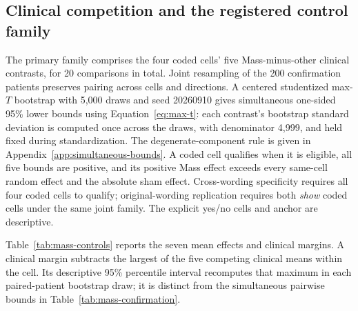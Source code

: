 \subsection{Clinical competition and the registered control family}

The primary family comprises the four coded cells' five Mass-minus-other
clinical contrasts, for 20 comparisons in total. Joint resampling of the
200 confirmation patients preserves pairing across cells and directions.
A centered studentized max-$T$ bootstrap with 5,000 draws and seed 20260910
gives simultaneous one-sided 95\% lower bounds using
Equation~\ref{eq:max-t}: each contrast's bootstrap standard deviation
is computed once across the draws, with denominator 4,999, and held
fixed during standardization. The degenerate-component rule is given in
Appendix~\ref{app:simultaneous-bounds}. A coded cell qualifies when
it is eligible, all five bounds are positive, and its positive Mass effect
exceeds every same-cell random effect and the absolute sham effect.
Cross-wording specificity requires all four coded cells to qualify;
original-wording replication requires both \textit{show} coded cells under
the same joint family. The explicit yes/no cells and anchor are descriptive.

Table~\ref{tab:mass-controls} reports the seven mean effects and clinical
margins. A clinical margin subtracts the largest of the five competing
clinical means within the cell. Its descriptive 95\% percentile interval
recomputes that maximum in each paired-patient bootstrap draw; it is
distinct from the simultaneous pairwise bounds in
Table~\ref{tab:mass-confirmation}.

\begin{table}[H]
\centering
\caption{Mass clinical and generic-control competition.}
\label{tab:mass-controls}
\end{table}

